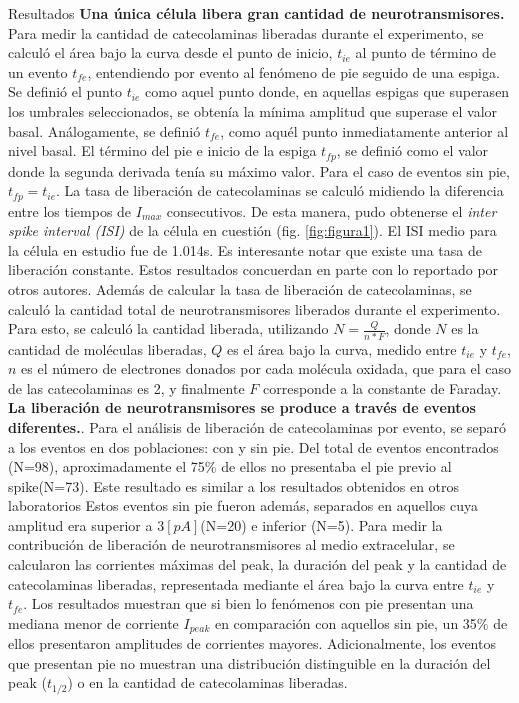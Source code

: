 \documentclass[twocolumn]{article}
\makeatletter
\def\section{\@startsection {section}{1}{\z@}{24pt plus 2pt minus 2pt}
{12pt plus 2pt minus 2pt}{\large\bf}}
\makeatother
\begin{document}
\section{Resultados}
{\bf Una única célula libera gran cantidad de neurotransmisores.} Para medir la cantidad de catecolaminas liberadas durante el experimento, se calculó el área bajo la curva desde el punto de inicio, $t_{ie}$ al punto de término de un evento $t_{fe}$, entendiendo por evento al fenómeno de pie seguido de una espiga.  Se definió el punto $t_{ie}$ como aquel punto donde, en aquellas espigas que superasen los umbrales seleccionados, se obtenía la mínima amplitud que superase el valor basal.  Análogamente, se definió $t_{fe}$, como aquél punto inmediatamente anterior al nivel basal. El término del pie e inicio de la espiga $t_{fp}$, se definió como el valor donde la segunda derivada tenía su máximo valor\citep{evanko2005primer}.  Para el caso de eventos sin pie, $t_{fp} = t_{ie}$.
La tasa de liberación de catecolaminas se calculó midiendo la diferencia entre los tiempos de $I_{max}$ consecutivos.  De esta manera, pudo obtenerse el \textit{inter spike interval (ISI)} de la célula en cuestión (fig. \ref{fig:figura1}). El ISI medio para la célula en estudio fue de 1.014s.  
Es interesante notar que existe una tasa de liberación constante. Estos resultados concuerdan en parte con lo reportado por otros autores\citep{jarukanont2015vesicle}.  
Además de calcular la tasa de liberación de catecolaminas, se calculó la cantidad total de neurotransmisores liberados durante el experimento.  Para esto, se calculó la cantidad liberada, utilizando $N = \frac{Q}{n*F}$, donde $N$ es la cantidad de moléculas liberadas, $Q$ es el área bajo la curva, medido entre $t_{ie}$ y $t_{fe}$, $n$ es el número de electrones donados por cada molécula oxidada, que para el caso de las catecolaminas es 2, y finalmente $F$ corresponde a la constante de Faraday\citep{evanko2005primer}.\\
{\bf La liberación de neurotransmisores se produce a través de eventos diferentes.}. Para el análisis de liberación de catecolaminas por evento, se separó a los eventos en dos poblaciones: con y sin pie.  Del total de eventos encontrados (N=98), aproximadamente el 75\% de ellos no presentaba el pie previo al spike(N=73). Este resultado es similar a los resultados obtenidos en otros laboratorios \cite{amatore2005correlation,amatore2009quantitative}  Estos eventos sin pie fueron además, separados en aquellos cuya amplitud era superior a $3[pA]$(N=20) e inferior (N=5).
Para medir la contribución de liberación de neurotransmisores al medio extracelular, se calcularon las corrientes máximas del peak, la duración del peak y la cantidad de catecolaminas liberadas, representada mediante el área bajo la curva entre $t_{ie}$ y $t_{fe}$. Los resultados muestran que si bien lo fenómenos con pie presentan una mediana menor de corriente $I_{peak}$ en comparación con aquellos sin pie, un 35\% de ellos presentaron amplitudes de corrientes mayores.  Adicionalmente, los eventos que presentan pie no muestran una distribución distinguible en la duración del peak ($t_{1/2}$) o en la cantidad de catecolaminas liberadas.
\end{document}
